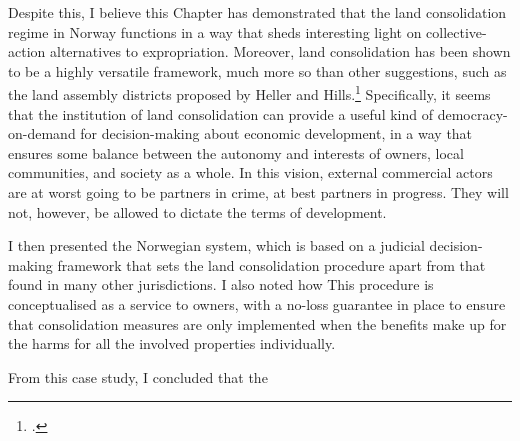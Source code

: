 Despite this, I believe this Chapter has demonstrated that the land consolidation regime in Norway functions in a way that sheds interesting light on collective-action alternatives to expropriation. Moreover, land consolidation has been shown to be a highly versatile framework, much more so than other suggestions, such as the land assembly districts proposed by Heller and Hills.\footcite{heller08} Specifically, it seems that the institution of land consolidation can provide a useful kind of democracy-on-demand for decision-making about economic development, in a way that ensures some balance between the autonomy and interests of owners, local communities, and society as a whole. In this vision, external commercial actors are at worst going to be partners in crime, at best partners in progress. They will not, however, be allowed to dictate the terms of development.


I then presented the Norwegian system, which is based on a judicial decision-making framework that sets the land consolidation procedure apart from that found in many other jurisdictions. I also noted how This procedure is conceptualised as a service to owners, with a no-loss guarantee in place to ensure that consolidation measures are only implemented when the benefits make up for the harms for all the involved properties individually.


From this case study, I concluded that the 